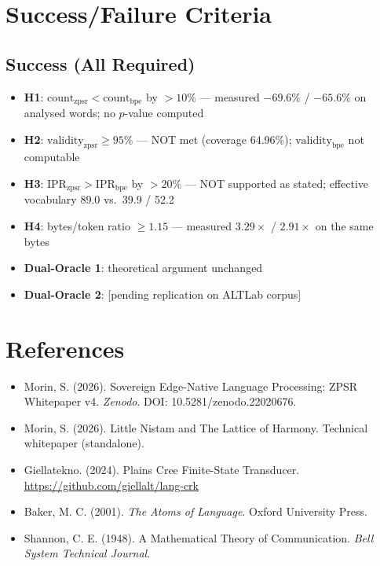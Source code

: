 \documentclass[11pt,oneside]{article}
\begin{document}
\section{Success/Failure Criteria}

\subsection{Success (All Required)}

\begin{itemize}
  \item \textbf{H1}: $\text{count}_{\text{zpsr}} < \text{count}_{\text{bpe}}$ by $>10\%$ --- measured $-69.6\%$ / $-65.6\%$ on analysed words; no $p$-value computed
  \item \textbf{H2}: $\text{validity}_{\text{zpsr}} \geq 95\%$ --- NOT met (coverage 64.96\%); $\text{validity}_{\text{bpe}}$ not computable
  \item \textbf{H3}: $\text{IPR}_{\text{zpsr}} > \text{IPR}_{\text{bpe}}$ by $>20\%$ --- NOT supported as stated; effective vocabulary 89.0 vs.\ 39.9 / 52.2
  \item \textbf{H4}: bytes/token ratio $\geq 1.15$ --- measured $3.29\times$ / $2.91\times$ on the same bytes
  \item \textbf{Dual-Oracle 1}: theoretical argument unchanged
  \item \textbf{Dual-Oracle 2}: [pending replication on ALTLab corpus]
\end{itemize}

\section{References}

\begin{itemize}
  \item Morin, S. (2026). Sovereign Edge-Native Language Processing: ZPSR Whitepaper v4. \emph{Zenodo}. DOI: 10.5281/zenodo.22020676.
  \item Morin, S. (2026). Little Nistam and The Lattice of Harmony. Technical whitepaper (standalone).
  \item Giellatekno. (2024). Plains Cree Finite-State Transducer. \url{https://github.com/giellalt/lang-crk}
  \item Baker, M. C. (2001). \emph{The Atoms of Language}. Oxford University Press.
  \item Shannon, C. E. (1948). A Mathematical Theory of Communication. \emph{Bell System Technical Journal}.
\end{itemize}
\end{document}

